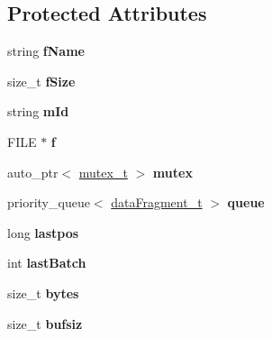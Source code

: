 \subsection*{\-Protected \-Attributes}
\begin{DoxyCompactItemize}
\item 
\hypertarget{classfileWriter__t_abe2c0644ae3e4d369e7935abc76774ea}{string {\bfseries f\-Name}}\label{classfileWriter__t_abe2c0644ae3e4d369e7935abc76774ea}

\item 
\hypertarget{classfileWriter__t_a3c69952b1f6f0a0c40e20a9f0039c34e}{size\-\_\-t {\bfseries f\-Size}}\label{classfileWriter__t_a3c69952b1f6f0a0c40e20a9f0039c34e}

\item 
\hypertarget{classfileWriter__t_ae586890ef77dc48bb6849b6ed8e8146b}{string {\bfseries m\-Id}}\label{classfileWriter__t_ae586890ef77dc48bb6849b6ed8e8146b}

\item 
\hypertarget{classfileWriter__t_a604955ef79c9bd96a25e1e3447c018ad}{\-F\-I\-L\-E $\ast$ {\bfseries f}}\label{classfileWriter__t_a604955ef79c9bd96a25e1e3447c018ad}

\item 
\hypertarget{classfileWriter__t_af67039fdd5cd9dd81bd5d45a4e29f0fd}{auto\-\_\-ptr$<$ \hyperlink{classmutex__t}{mutex\-\_\-t} $>$ {\bfseries mutex}}\label{classfileWriter__t_af67039fdd5cd9dd81bd5d45a4e29f0fd}

\item 
\hypertarget{classfileWriter__t_ac3ecb5b52d8bee0957402354c6c45b19}{priority\-\_\-queue$<$ \hyperlink{classdataFragment__t}{data\-Fragment\-\_\-t} $>$ {\bfseries queue}}\label{classfileWriter__t_ac3ecb5b52d8bee0957402354c6c45b19}

\item 
\hypertarget{classfileWriter__t_add3b29663cd94c5c0199a2031144b0c9}{long {\bfseries lastpos}}\label{classfileWriter__t_add3b29663cd94c5c0199a2031144b0c9}

\item 
\hypertarget{classfileWriter__t_a4579c3c320ab5bc2a8d4bcf03e589316}{int {\bfseries last\-Batch}}\label{classfileWriter__t_a4579c3c320ab5bc2a8d4bcf03e589316}

\item 
\hypertarget{classfileWriter__t_acd212002853baf898126011fe29247c3}{size\-\_\-t {\bfseries bytes}}\label{classfileWriter__t_acd212002853baf898126011fe29247c3}

\item 
\hypertarget{classfileWriter__t_a9c8d80d7491dd4d7d1883b2ec089baac}{size\-\_\-t {\bfseries bufsiz}}\label{classfileWriter__t_a9c8d80d7491dd4d7d1883b2ec089baac}


\end{DoxyCompactItemize}
